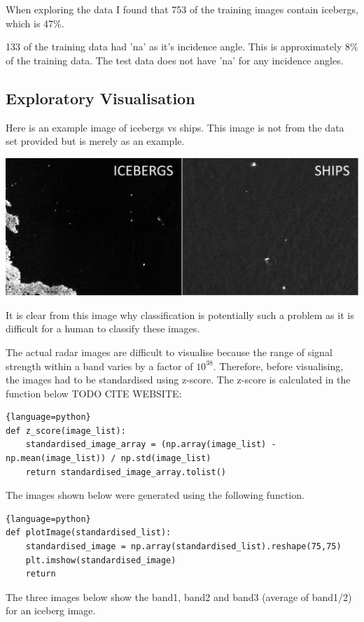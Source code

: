 \documentclass{article}
\begin{document}
When exploring the data I found that 753 of the training images contain icebergs, which is 47\%. 

133 of the training data had 'na' as it's incidence angle. This is approximately 8\% of the training data. The test data does not have 'na' for any incidence angles.  
\subsection{Exploratory Visualisation}
Here is an example image of icebergs vs ships. This image is not from the data set provided but is merely as an example.

\includegraphics[scale=0.125]{ship-iceberg}

\cite{kaggle}
It is clear from this image why classification is potentially such a problem as it is difficult for a human to classify these images. 

The actual radar images are difficult to visualise because the range of signal strength within a band varies by a factor of $10^{38}$. Therefore, before visualising, the images had to be standardised using z-score. The z-score is calculated in the function below TODO CITE WEBSITE:
\begin{lstlisting}{language=python}
def z_score(image_list):
    standardised_image_array = (np.array(image_list) -np.mean(image_list)) / np.std(image_list)
    return standardised_image_array.tolist()
\end{lstlisting}

The images shown below were generated using the following function.
\begin{lstlisting}{language=python}
def plotImage(standardised_list):
    standardised_image = np.array(standardised_list).reshape(75,75)
    plt.imshow(standardised_image)
    return
\end{lstlisting}

The three images below show the band1, band2 and band3 (average of band1/2) for an iceberg image.
\end{document}

